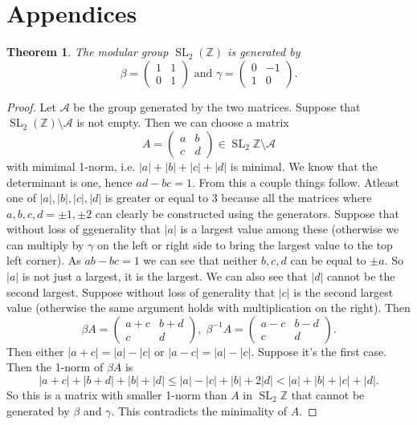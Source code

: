 \documentclass[a4paper]{article}
\theoremstyle{theoremdd}
\newtheorem{theorem}{Theorem}[section]
\theoremstyle{definitiondd}
\theoremstyle{remarkdd}
\newcommand{\Z}{\mathbb{Z}}
\DeclareMathOperator{\SL}{SL}
\begin{document}
\section{Appendices}
\begin{theorem}
	The modular group $\SL_2(\Z)$ is generated by \[ 	
	\beta = \begin{pmatrix}  1 & 1 \\ 0 & 1 \end{pmatrix} 
	\text{ and }
	\gamma =  \begin{pmatrix} 0 & -1 \\ 1 & 0 \end{pmatrix} 
.\] 
\end{theorem}
\begin{proof}
	Let $\mathcal{A} $ be the group generated by the two matrices. 
	Suppose that $\SL_2(\Z) \setminus \mathcal{A} $ is not empty.
	Then we can choose a matrix \[
		A =\begin{pmatrix} a & b \\ c& d\end{pmatrix} \in \SL_2\Z \setminus \mathcal{A} 
	\] 
	with mimimal 1-norm, i.e. $|a| + |b| + |c| + |d|$ is minimal.
	We know that the determinant is one, hence $ad- bc = 1$. From this a couple things follow. Atleast one of  $|a|, |b|,|c|,|d|$ is greater or equal to 3 because all the matrices where $a, b, c, d = \pm 1, \pm 2$ can clearly be constructed using the generators. Suppose that without loss of ggenerality that $|a|$ is a largest value among these (otherwise we can multiply by $\gamma$ on the left or right side to bring the largest value to the top left corner).
	As  $ab - bc = 1$ we can see that neither  $b, c, d$ can be equal to $\pm a$.  
	So  $|a|$ is not just a largest, it is the largest. 
	We can also see that $|d|$ cannot be the second largest. 
	Suppose without loss of generality that $|c|$ is the second largest value (otherwise the same argument holds with multiplication on the right).
	Then  \[
		\beta A = \begin{pmatrix} a + c & b + d  \\ c & d\end{pmatrix}, \; \beta^{-1} A = \begin{pmatrix} a - c & b - d \\ c & d \end{pmatrix} 
	.\]
	Then either $|a + c| = |a| - |c|$ or  $|a - c| =  |a|  - |c|$. Suppose it's the first case. 
	Then the 1-norm of $\beta A$ is
	 \[
	|a + c| + |b + d| + |b| + |d| \le |a| - |c| + |b| + 2|d| < |a| + |b| + |c| + |d|
	.\] 
	So this is a matrix with smaller 1-norm than $A$ in $\SL_2\Z$ that cannot be generated by $\beta$ and  $\gamma$. 
	This contradicts the minimality of $A$. 
\end{proof}
\end{document}
